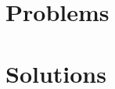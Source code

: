 \documentclass{article}
\begin{document}
\section{Problems}
\placestatements


\section{Solutions}
\placesolutions
\end{document}
